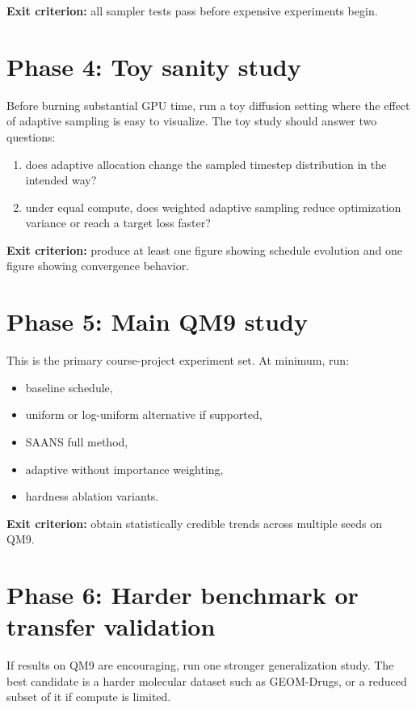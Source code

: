\documentclass[11pt]{report}
\begin{document}
\textbf{Exit criterion:} all sampler tests pass before expensive experiments begin.

\section{Phase 4: Toy sanity study}

Before burning substantial GPU time, run a toy diffusion setting where the effect of adaptive sampling is easy to visualize. The toy study should answer two questions:

\begin{enumerate}[leftmargin=2em]
    \item does adaptive allocation change the sampled timestep distribution in the intended way?
    \item under equal compute, does weighted adaptive sampling reduce optimization variance or reach a target loss faster?
\end{enumerate}

\textbf{Exit criterion:} produce at least one figure showing schedule evolution and one figure showing convergence behavior.

\section{Phase 5: Main QM9 study}

This is the primary course-project experiment set. At minimum, run:

\begin{itemize}[leftmargin=2em]
    \item baseline schedule,
    \item uniform or log-uniform alternative if supported,
    \item SAANS full method,
    \item adaptive without importance weighting,
    \item hardness ablation variants.
\end{itemize}

\textbf{Exit criterion:} obtain statistically credible trends across multiple seeds on QM9.

\section{Phase 6: Harder benchmark or transfer validation}

If results on QM9 are encouraging, run one stronger generalization study. The best candidate is a harder molecular dataset such as GEOM-Drugs, or a reduced subset of it if compute is limited.
\end{document}
